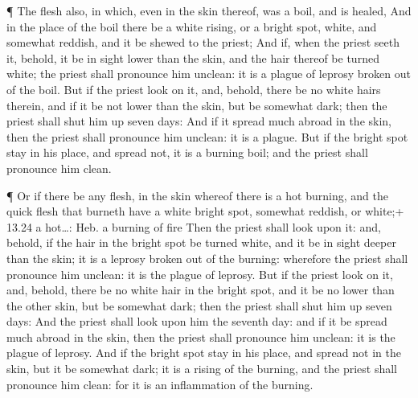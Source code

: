 ¶ The flesh also, in which, even in the skin thereof, was
a boil, and is healed,  And in the place of the boil there
be a white rising, or a bright spot, white, and somewhat reddish, and it
be shewed to the priest;  And if, when the priest seeth it,
behold, it be in sight lower than the skin, and the hair thereof be
turned white; the priest shall pronounce him unclean: it is a plague of
leprosy broken out of the boil.  But if the priest look on
it, and, behold, there be no white hairs therein, and if it be not lower
than the skin, but be somewhat dark; then the priest shall shut him up
seven days:  And if it spread much abroad in the skin, then
the priest shall pronounce him unclean: it is a plague. 
But if the bright spot stay in his place, and spread not, it is a
burning boil; and the priest shall pronounce him clean.

 ¶ Or if there be any flesh, in the skin whereof there is a
hot burning, and the quick flesh that burneth have a white bright spot,
somewhat reddish, or white;+ 13.24 a hot\ldots: Heb. a burning of fire
 Then the priest shall look upon it: and, behold, if the
hair in the bright spot be turned white, and it be in sight deeper than
the skin; it is a leprosy broken out of the burning: wherefore the
priest shall pronounce him unclean: it is the plague of leprosy.
 But if the priest look on it, and, behold, there be no
white hair in the bright spot, and it be no lower than the other skin,
but be somewhat dark; then the priest shall shut him up seven days:
 And the priest shall look upon him the seventh day: and if
it be spread much abroad in the skin, then the priest shall pronounce
him unclean: it is the plague of leprosy.  And if the
bright spot stay in his place, and spread not in the skin, but it be
somewhat dark; it is a rising of the burning, and the priest shall
pronounce him clean: for it is an inflammation of the burning.

